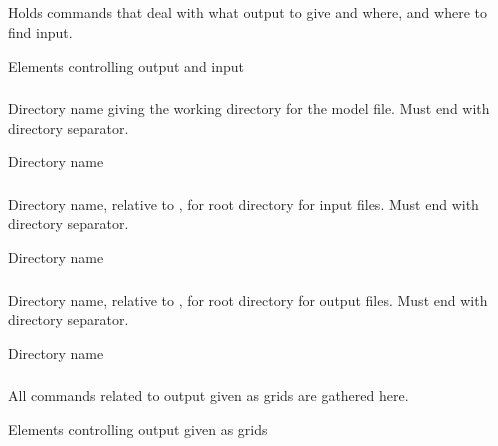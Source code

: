 \subsection{} 
 \slist
   \item \Description Holds commands that deal with what output to give and where, and where to find input.
   \item \Argument Elements controlling output and input
   \item \Default
 \elist

\subsubsection{} 
 \slist
   \item \Description Directory name giving the working directory for the model file. Must end with directory separator.
   \item \Argument Directory name
   \item \Default
 \elist

\subsubsection{} 
 \slist
   \item \Description Directory name, relative to , for root directory for input files. Must end with directory separator.
   \item \Argument Directory name
   \item \Default
 \elist

\subsubsection{} 
 \slist
   \item \Description Directory name, relative to , for root directory for output files. Must end with directory separator.
   \item \Argument Directory name
   \item \Default
 \elist


\subsubsection{}
 \slist
   \item \Description All commands related to output given as grids are gathered here.
   \item \Argument Elements controlling output given as grids
   \item \Default
 \elist

